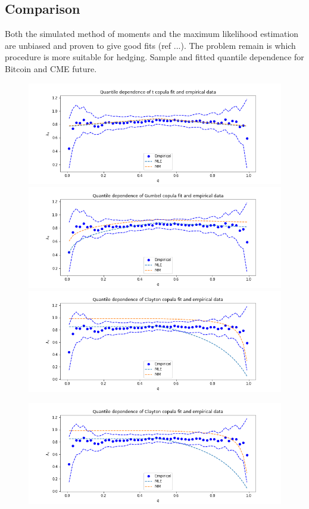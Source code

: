 \subsection{Comparison}
Both the simulated method of moments and the maximum likelihood estimation are unbiased and
proven to give good fits (ref ...).
The problem remain is which procedure is more suitable for hedging.
Sample and fitted quantile dependence for Bitcoin and CME future.

\begin{figure}[h]
\includegraphics[width=\textwidth]{_pics/t Copula quantile dependence.png}
\includegraphics[width=\textwidth]{_pics/Gumbel Copula quantile dependence.png}
\includegraphics[width=\textwidth]{_pics/Clayton Copula quantile dependence.png}
  \caption{}
\label{fig:quantile dependence1}
\end{figure}
\begin{figure}[h]
\includegraphics[width=\textwidth]{_pics/Clayton Copula quantile dependence.png}
  \caption{}
\label{fig:quantile dependence2}
\end{figure}


